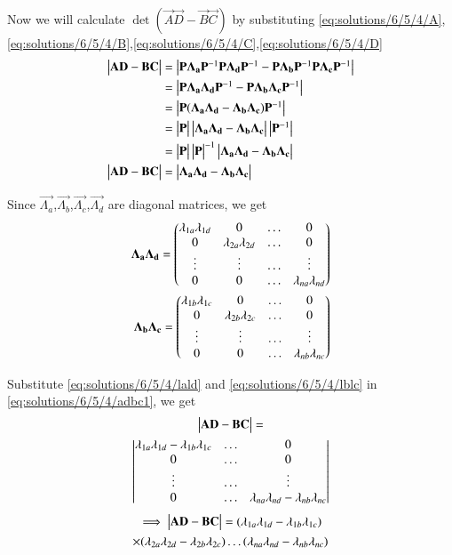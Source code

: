 Now we will calculate $\det(\vec{A}\vec{D}-\vec{B}\vec{C})$ by substituting \eqref{eq:solutions/6/5/4/A},\eqref{eq:solutions/6/5/4/B},\eqref{eq:solutions/6/5/4/C},\eqref{eq:solutions/6/5/4/D}
\begin{align}
    \begin{vmatrix}\mathbf{A}\mathbf{D}-\mathbf{B}\mathbf{C}\end{vmatrix}&=\begin{vmatrix}\mathbf{P}\mathbf{\Lambda_a}\mathbf{P}^{-1}\mathbf{P}\mathbf{\Lambda_d}\mathbf{P}^{-1}-\mathbf{P}\mathbf{\Lambda_b}\mathbf{P}^{-1}\mathbf{P}\mathbf{\Lambda_c}\mathbf{P}^{-1}\end{vmatrix}\\
    &=\begin{vmatrix}\mathbf{P}\mathbf{\Lambda_a}\mathbf{\Lambda_d}\mathbf{P}^{-1}-\mathbf{P}\mathbf{\Lambda_b}\mathbf{\Lambda_c}\mathbf{P}^{-1}\end{vmatrix}\\
    &=\begin{vmatrix}\mathbf{P}(\mathbf{\Lambda_a}\mathbf{\Lambda_d}-\mathbf{\Lambda_b}\mathbf{\Lambda_c})\mathbf{P}^{-1}\end{vmatrix}\\
    &=\begin{vmatrix}\mathbf{P}\end{vmatrix}\begin{vmatrix}\mathbf{\Lambda_a}\mathbf{\Lambda_d}-\mathbf{\Lambda_b}\mathbf{\Lambda_c}\end{vmatrix}\begin{vmatrix}\mathbf{P}^{-1}\end{vmatrix}\\
    &=\begin{vmatrix}\mathbf{P}\end{vmatrix}\begin{vmatrix}\mathbf{P}\end{vmatrix}^{-1}\begin{vmatrix}\mathbf{\Lambda_a}\mathbf{\Lambda_d}-\mathbf{\Lambda_b}\mathbf{\Lambda_c}\end{vmatrix}\\
    \begin{vmatrix}\mathbf{A}\mathbf{D}-\mathbf{B}\mathbf{C}\end{vmatrix}&=\begin{vmatrix}\mathbf{\Lambda_a}\mathbf{\Lambda_d}-\mathbf{\Lambda_b}\mathbf{\Lambda_c}\end{vmatrix}\label{eq:solutions/6/5/4/adbc1}
\end{align}

Since $\vec{\Lambda_a}$,$\vec{\Lambda_b}$,$\vec{\Lambda_c}$,$\vec{\Lambda_d}$ are diagonal matrices, we get
\begin{align}
    \mathbf{\Lambda_a}\mathbf{\Lambda_d}=\begin{pmatrix}\lambda_{1a}\lambda_{1d}&0&\dots&0\\0&\lambda_{2a}\lambda_{2d}&\dots&0\\\vdots&\vdots&\dots&\vdots\\0&0&\dots&\lambda_{na}\lambda_{nd}\end{pmatrix}\label{eq:solutions/6/5/4/lald}\\
    \mathbf{\Lambda_b}\mathbf{\Lambda_c}=\begin{pmatrix}\lambda_{1b}\lambda_{1c}&0&\dots&0\\0&\lambda_{2b}\lambda_{2c}&\dots&0\\\vdots&\vdots&\dots&\vdots\\0&0&\dots&\lambda_{nb}\lambda_{nc}\end{pmatrix}\label{eq:solutions/6/5/4/lblc}\\
\end{align}

Substitute \eqref{eq:solutions/6/5/4/lald} and \eqref{eq:solutions/6/5/4/lblc} in \eqref{eq:solutions/6/5/4/adbc1}, we get
\begin{multline}
    \begin{vmatrix}\mathbf{A}\mathbf{D}-\mathbf{B}\mathbf{C}\end{vmatrix}=\\\begin{vmatrix}\lambda_{1a}\lambda_{1d}-\lambda_{1b}\lambda_{1c}&\dots&0\\0&\dots&0\\\vdots&\dots&\vdots\\0&\dots&\lambda_{na}\lambda_{nd}-\lambda_{nb}\lambda_{nc}\end{vmatrix}
\end{multline}
\begin{multline}
    \implies\begin{vmatrix}\mathbf{A}\mathbf{D}-\mathbf{B}\mathbf{C}\end{vmatrix}=(\lambda_{1a}\lambda_{1d}-\lambda_{1b}\lambda_{1c})\\\times(\lambda_{2a}\lambda_{2d}-\lambda_{2b}\lambda_{2c})\dots(\lambda_{na}\lambda_{nd}-\lambda_{nb}\lambda_{nc})\label{eq:solutions/6/5/4/adbcfin}
\end{multline}

